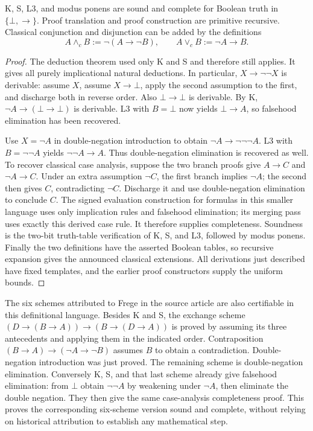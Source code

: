\begin{theorem}\label{thm:three-axiom}
K, S, L3, and modus ponens are sound and complete for Boolean truth in
$\{\bot,\to\}$. Proof translation and proof construction are primitive
recursive. Classical conjunction and disjunction can be added by the
definitions
\[
 A\wedge_c B:=\neg(A\to\neg B),\qquad
 A\vee_c B:=\neg A\to B.
\]
\end{theorem}
\begin{proof}
The deduction theorem used only K and S and therefore still applies.
It gives all purely implicational natural deductions. In particular,
$X\to\neg\neg X$ is derivable: assume $X$, assume $X\to\bot$, apply the
second assumption to the first, and discharge both in reverse order.
Also $\bot\to\bot$ is derivable. By K,
$\neg A\to(\bot\to\bot)$ is derivable. L3 with $B=\bot$ now yields
$\bot\to A$, so falsehood elimination has been recovered.

Use $X=\neg A$ in double-negation introduction to obtain
$\neg A\to\neg\neg\neg A$. L3 with $B=\neg\neg A$ yields
$\neg\neg A\to A$. Thus double-negation elimination is recovered as well.
To recover classical case analysis, suppose the two branch proofs give
$A\to C$ and $\neg A\to C$. Under an extra assumption $\neg C$, the first
branch implies $\neg A$; the second then gives $C$, contradicting $\neg C$.
Discharge it and use double-negation elimination to conclude $C$.
The signed evaluation construction for formulas in this smaller language
uses only implication rules and falsehood elimination; its merging pass
uses exactly this derived case rule. It therefore supplies completeness.
Soundness is the two-bit truth-table verification of K, S, and L3, followed
by modus ponens. Finally the two definitions have the asserted Boolean
tables, so recursive expansion gives the announced classical extensions.
All derivations just described have fixed templates, and the earlier
proof constructors supply the uniform bounds.
\end{proof}

The six schemes attributed to Frege in the source article are also
certifiable in this definitional language. Besides K and S, the exchange
scheme $(D\to(B\to A))\to(B\to(D\to A))$ is proved by assuming its three
antecedents and applying them in the indicated order. Contraposition
$(B\to A)\to(\neg A\to\neg B)$ assumes $B$ to obtain a contradiction.
Double-negation introduction was just proved. The remaining scheme is
double-negation elimination. Conversely K, S, and that last scheme already
give falsehood elimination: from $\bot$ obtain $\neg\neg A$ by weakening
under $\neg A$, then eliminate the double negation. They then give the
same case-analysis completeness proof. This proves the corresponding
six-scheme version sound and complete, without relying on historical
attribution to establish any mathematical step.

